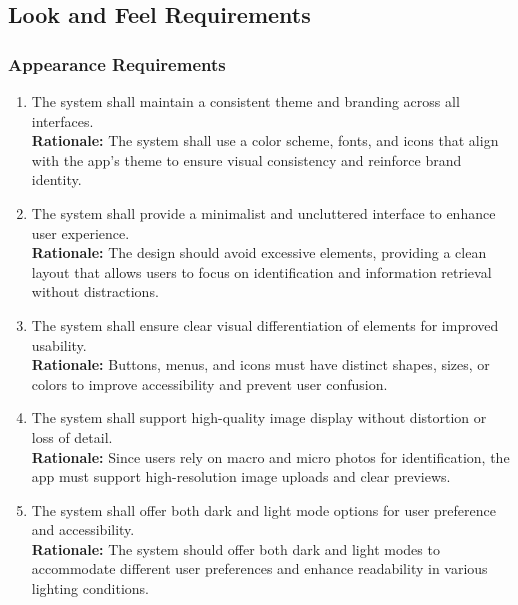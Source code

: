 \documentclass[]{article}
\begin{document}
\subsection{Look and Feel Requirements}
\label{sub:look_and_feel_requirements}

\subsubsection{Appearance Requirements}
\label{ssub:appearance_requirements}
\begin{enumerate}[{LF-A}1. ]
	\item The system shall maintain a consistent theme and branding across all interfaces.\\
	\textbf{Rationale:} The system shall use a color scheme, fonts, and icons that align with the app’s theme to ensure visual consistency and reinforce brand identity.
	\item The system shall provide a minimalist and uncluttered interface to enhance user experience.\\
	\textbf{Rationale:} The design should avoid excessive elements, providing a clean layout that allows users to focus on identification and information retrieval without distractions.
	\item The system shall ensure clear visual differentiation of elements for improved usability.\\
	\textbf{Rationale:} Buttons, menus, and icons must have distinct shapes, sizes, or colors to improve accessibility and prevent user confusion.
	\item The system shall support high-quality image display without distortion or loss of detail.\\
	\textbf{Rationale:} Since users rely on macro and micro photos for identification, the app must support high-resolution image uploads and clear previews.
	\item The system shall offer both dark and light mode options for user preference and accessibility.\\
	\textbf{Rationale:} The system should offer both dark and light modes to accommodate different user preferences and enhance readability in various lighting conditions.
\end{enumerate}
\end{document}
